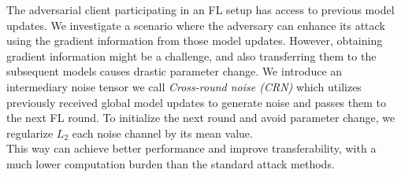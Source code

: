 The adversarial client participating in an FL setup has access to previous model updates. We investigate a scenario where the adversary can enhance its attack using the gradient information from those model updates. However, obtaining gradient information might be a challenge, and also transferring them to the subsequent models causes drastic parameter change.\cite{zheng2020efficient}
We introduce an intermediary noise tensor we call \textit{Cross-round noise (CRN)} which utilizes previously received global model updates to generate noise and passes them to the next FL round. To initialize the next round and avoid parameter change, we regularize $L_{2}$ each noise channel by its mean value. 
\\This way can achieve better performance and improve transferability, with a much lower computation burden than the standard attack methods. %










